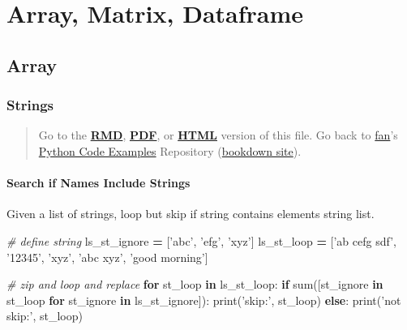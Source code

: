 \documentclass[
]{book}
\newenvironment{Shaded}{\begin{snugshade}}{\end{snugshade}}
\newcommand{\BuiltInTok}[1]{#1}
\newcommand{\CommentTok}[1]{\textcolor[rgb]{0.56,0.35,0.01}{\textit{#1}}}
\newcommand{\ControlFlowTok}[1]{\textcolor[rgb]{0.13,0.29,0.53}{\textbf{#1}}}
\newcommand{\KeywordTok}[1]{\textcolor[rgb]{0.13,0.29,0.53}{\textbf{#1}}}
\newcommand{\NormalTok}[1]{#1}
\newcommand{\OperatorTok}[1]{\textcolor[rgb]{0.81,0.36,0.00}{\textbf{#1}}}
\newcommand{\StringTok}[1]{\textcolor[rgb]{0.31,0.60,0.02}{#1}}
\begin{document}
\hypertarget{array-matrix-dataframe}{%
\chapter{Array, Matrix, Dataframe}\label{array-matrix-dataframe}}

\hypertarget{array}{%
\section{Array}\label{array}}

\hypertarget{strings}{%
\subsection{Strings}\label{strings}}

\begin{quote}
Go to the \href{https://github.com/FanWangEcon//pyfan/blob/master/.//A-Collection-of-Python-Examples.Rmd}{\textbf{RMD}}, \href{https://github.com/FanWangEcon//pyfan/blob/master/.//htmlpdfr/A-Collection-of-Python-Examples.pdf}{\textbf{PDF}}, or \href{https://fanwangecon.github.io//pyfan/.//htmlpdfr/A-Collection-of-Python-Examples.html}{\textbf{HTML}} version of this file. Go back to \href{http://fanwangecon.github.io/}{fan}'s \href{https://fanwangecon.github.io/pyfan/}{Python Code Examples} Repository (\href{https://fanwangecon.github.io/pyfan/bookdown}{bookdown site}).
\end{quote}

\hypertarget{search-if-names-include-strings}{%
\subsubsection{Search if Names Include Strings}\label{search-if-names-include-strings}}

Given a list of strings, loop but skip if string contains elements string list.

\begin{Shaded}
\begin{Highlighting}[]
\CommentTok{# define string}
\NormalTok{ls_st_ignore }\OperatorTok{=}\NormalTok{ [}\StringTok{'abc'}\NormalTok{, }\StringTok{'efg'}\NormalTok{, }\StringTok{'xyz'}\NormalTok{]}
\NormalTok{ls_st_loop }\OperatorTok{=}\NormalTok{ [}\StringTok{'ab cefg sdf'}\NormalTok{, }\StringTok{'12345'}\NormalTok{, }\StringTok{'xyz'}\NormalTok{, }\StringTok{'abc xyz'}\NormalTok{, }\StringTok{'good morning'}\NormalTok{]}

\CommentTok{# zip and loop and replace}
\ControlFlowTok{for}\NormalTok{ st_loop }\KeywordTok{in}\NormalTok{ ls_st_loop:}
  \ControlFlowTok{if} \BuiltInTok{sum}\NormalTok{([st_ignore }\KeywordTok{in}\NormalTok{ st_loop }\ControlFlowTok{for}\NormalTok{ st_ignore }\KeywordTok{in}\NormalTok{ ls_st_ignore]):}
    \BuiltInTok{print}\NormalTok{(}\StringTok{'skip:'}\NormalTok{, st_loop)}
  \ControlFlowTok{else}\NormalTok{:}
    \BuiltInTok{print}\NormalTok{(}\StringTok{'not skip:'}\NormalTok{, st_loop)}
\end{Highlighting}
\end{Shaded}
\end{document}
